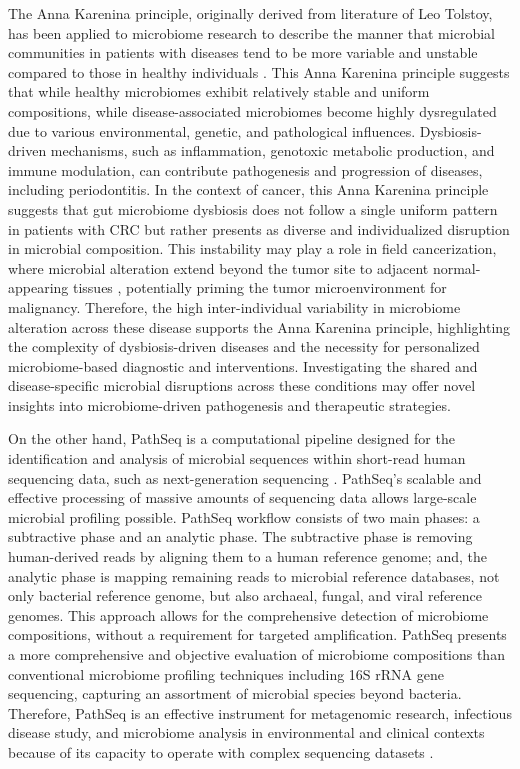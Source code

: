 \documentclass[11pt, a4paper, onecolumn, oneside]{report}
\begin{document}
        The Anna Karenina principle, originally derived from literature of Leo Tolstoy, has been applied to microbiome research to describe the manner that microbial communities in patients with diseases tend to be more variable and unstable compared to those in healthy individuals \cite{Anna-1, Anna-2}. This Anna Karenina principle suggests that while healthy microbiomes exhibit relatively stable and uniform compositions, while disease-associated microbiomes become highly dysregulated due to various environmental, genetic, and pathological influences. Dysbiosis-driven mechanisms, such as inflammation, genotoxic metabolic production, and immune modulation, can contribute pathogenesis and progression of diseases, including periodontitis. In the context of  cancer, this Anna Karenina principle suggests that gut microbiome dysbiosis does not follow a single uniform pattern in patients with CRC but rather presents as diverse and individualized disruption in microbial composition. This instability may play a role in field cancerization, where microbial alteration extend beyond the tumor site to adjacent normal-appearing tissues \cite{cancerization-1, cancerization-2}, potentially priming the tumor microenvironment for malignancy. Therefore, the high inter-individual variability in microbiome alteration across these disease supports the Anna Karenina principle, highlighting the complexity of dysbiosis-driven diseases and the necessity for personalized microbiome-based diagnostic and interventions. Investigating the shared and disease-specific microbial disruptions across these conditions may offer novel insights into microbiome-driven pathogenesis and therapeutic strategies.

        On the other hand, PathSeq is a computational pipeline designed for the identification and analysis of microbial sequences within short-read human sequencing data, such as next-generation sequencing \cite{PathSeq-1, PathSeq-2}. PathSeq's scalable and effective processing of massive amounts of sequencing data allows large-scale microbial profiling possible. PathSeq workflow consists of two main phases: a subtractive phase and an analytic phase. The subtractive phase is removing human-derived reads by aligning them to a human reference genome; and, the analytic phase is mapping remaining reads to microbial reference databases, not only bacterial reference genome, but also archaeal, fungal, and viral reference genomes. This approach allows for the comprehensive detection of microbiome compositions, without a requirement for targeted amplification. PathSeq presents a more comprehensive and objective evaluation of microbiome compositions than conventional microbiome profiling techniques including 16S rRNA gene sequencing, capturing an assortment of microbial species beyond bacteria. Therefore, PathSeq is an effective instrument for metagenomic research, infectious disease study, and microbiome analysis in environmental and clinical contexts because of its capacity to operate with complex sequencing datasets \cite{PathSeq-analysis-1, PathSeq-analysis-2, PathSeq-analysis-3}.
\end{document}
